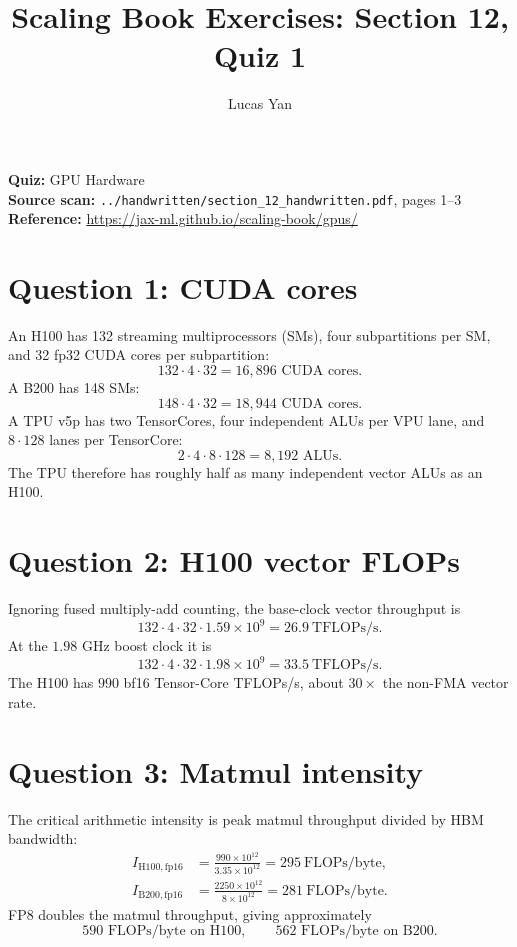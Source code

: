 \documentclass[11pt]{article}
\title{Scaling Book Exercises: Section 12, Quiz 1}
\author{Lucas Yan}
\date{}
\begin{document}
\maketitle

\noindent
\textbf{Quiz:} GPU Hardware\\
\textbf{Source scan:} \texttt{../handwritten/section\_12\_handwritten.pdf},
pages 1--3\\
\textbf{Reference:} \url{https://jax-ml.github.io/scaling-book/gpus/}

\section*{Question 1: CUDA cores}

An H100 has 132 streaming multiprocessors (SMs), four subpartitions per SM,
and 32 fp32 CUDA cores per subpartition:
\[
\boxed{132\cdot4\cdot32=16{,}896\text{ CUDA cores}.}
\]
A B200 has 148 SMs:
\[
\boxed{148\cdot4\cdot32=18{,}944\text{ CUDA cores}.}
\]
A TPU v5p has two TensorCores, four independent ALUs per VPU lane, and
\(8\cdot128\) lanes per TensorCore:
\[
\boxed{2\cdot4\cdot8\cdot128=8{,}192\text{ ALUs}.}
\]
The TPU therefore has roughly half as many independent vector ALUs as an
H100.

\section*{Question 2: H100 vector FLOPs}

Ignoring fused multiply-add counting, the base-clock vector throughput is
\[
132\cdot4\cdot32\cdot1.59\times10^9
=\boxed{26.9\ \text{TFLOPs/s}}.
\]
At the \(1.98\) GHz boost clock it is
\[
132\cdot4\cdot32\cdot1.98\times10^9
=\boxed{33.5\ \text{TFLOPs/s}}.
\]
The H100 has \(990\) bf16 Tensor-Core TFLOPs/s, about \(30\times\) the
non-FMA vector rate.

\section*{Question 3: Matmul intensity}

The critical arithmetic intensity is peak matmul throughput divided by HBM
bandwidth:
\begin{align*}
I_{\mathrm{H100,fp16}}
&=\frac{990\times10^{12}}{3.35\times10^{12}}
=\boxed{295\ \text{FLOPs/byte}},\\
I_{\mathrm{B200,fp16}}
&=\frac{2250\times10^{12}}{8\times10^{12}}
=\boxed{281\ \text{FLOPs/byte}}.
\end{align*}
FP8 doubles the matmul throughput, giving approximately
\[
\boxed{590\text{ FLOPs/byte on H100},\qquad
562\text{ FLOPs/byte on B200}.}
\]
\end{document}
